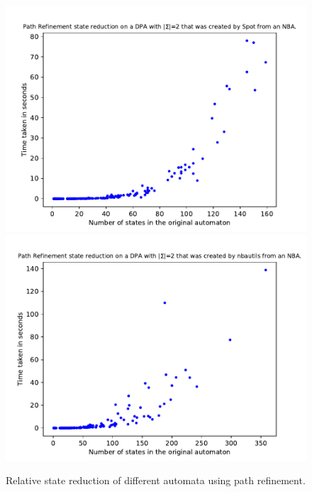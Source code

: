 \begin{figure}
\begin{minipage}{0.49\textwidth}
		\includegraphics[page=2,height=.3\textheight]{../data/analysis/path_refinement/detspot_ap1.pdf} 
		\includegraphics[page=2,height=.3\textheight]{../data/analysis/path_refinement/detnbaut_ap1.pdf} 
		\caption{Relative state reduction of different automata using path refinement.}
		\label{exp:fig:path_refinement_reduct_abs}
	\end{minipage}
\end{figure}


